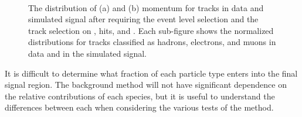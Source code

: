 \begin{figure}[h]
\centering
{}
\\
\caption{The distribution of (a) \dedx and (b) momentum for tracks in data and simulated signal after requiring the event level selection and the track selection on \pt, hits, and \Nsplit. Each sub-figure shows the normalized distributions for tracks classified as hadrons, electrons, and muons in data and \rhadrons in the simulated signal.}
\label{fig:background_species}
\end{figure}

It is difficult to determine what fraction of each particle type enters into the final signal region.
The background method will not have significant dependence on the relative contributions of each species, but it is useful to understand the differences between each when considering the various tests of the method.

